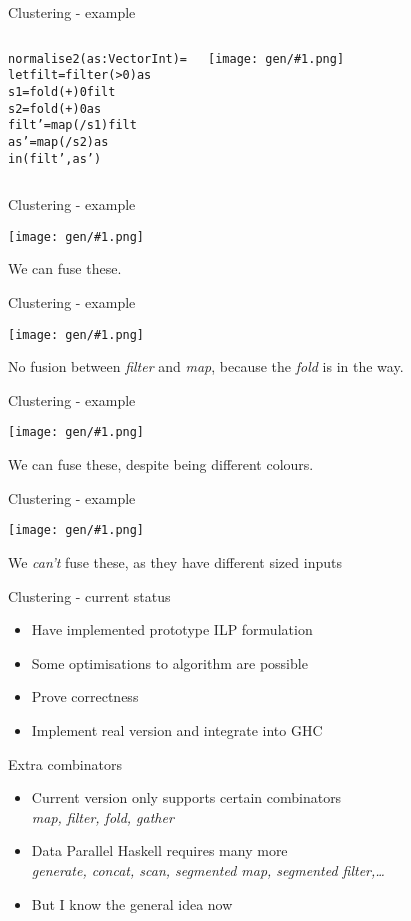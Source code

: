 \documentclass{beamer}
\newcommand{\bl}[1]{\textcolor[rgb]{0.0,0.5,0.9}{#1}}
\newcommand{\g}[1]{\textcolor[rgb]{0.7,0.3,0.3}{#1}}
\newcommand{\fr}[1]{\begin{frame}[fragile]{#1}}
\newcommand{\im}[1]{\texttt{[image: gen/\#1.png]} \\ }
\begin{document}
\fr{Clustering - example}
\begin{columns}
\column{6cm}
\begin{alltt}\small
normalise2 (\bl{as} : Vector Int) =
 let \bl{filt}  = \g{filter} (>0)  \bl{as}
     \bl{s1}    = \g{fold}   (+) 0 \bl{filt}
     \bl{s2}    = \g{fold}   (+) 0 \bl{as}
     \bl{filt'} = \g{map}    (/\bl{s1}) \bl{filt}
     \bl{as'}   = \g{map}    (/\bl{s2}) \bl{as}
 in (\bl{filt'}, \bl{as'})
\end{alltt}

\column{5cm}
\im{normalise2-unfused}
\end{columns}
\end{frame}


\fr{Clustering - example}
\begin{center}
\im{normalise2-f1}
\end{center}
We can fuse these.
\end{frame}

\fr{Clustering - example}
\begin{center}
\im{normalise2-f2}
\end{center}
No fusion between \emph{filter} and \emph{map}, because the \emph{fold} is in the way.
\end{frame}

\fr{Clustering - example}
\begin{center}
\im{normalise2-f3}
\end{center}
We can fuse these, despite being different colours.
\end{frame}

\fr{Clustering - example}
\begin{center}
\im{normalise2-f4}
\end{center}
We \emph{can't} fuse these, as they have different sized inputs
\end{frame}

\fr{Clustering - current status}
\begin{itemize}
\item
Have implemented prototype ILP formulation
\item
Some optimisations to algorithm are possible
\item
Prove correctness
\item
Implement real version and integrate into GHC
\end{itemize}
\end{frame}

\fr{Extra combinators}
\begin{itemize}
\item
Current version only supports certain combinators
\\
\emph{map, filter, fold, gather}
\item
Data Parallel Haskell requires many more
\\
\emph{generate, concat, scan, segmented map, segmented filter,\ldots}
\item
But I know the general idea now
\end{itemize}
\end{frame}
\end{document}

